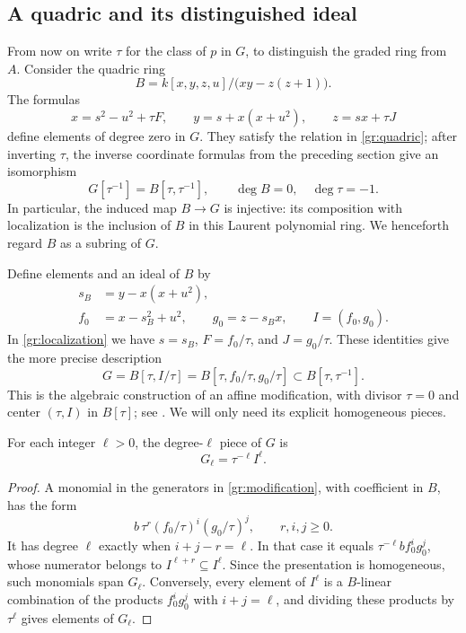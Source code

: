 \subsection{A quadric and its distinguished ideal}

From now on write $\tau$ for the class of $p$ in $G$, to distinguish
the graded ring from $A$.  Consider the quadric ring
\begin{equation}
\label{gr:quadric}
 B=k[x,y,z,u]/\bigl(xy-z(z+1)\bigr).
\end{equation}
The formulas
\[
 x=s^2-u^2+\tau F,\qquad
 y=s+x(x+u^2),\qquad z=sx+\tau J
\]
define elements of degree zero in $G$.  They satisfy the relation in
\eqref{gr:quadric}; after inverting $\tau$, the inverse coordinate
formulas from the preceding section give an isomorphism
\begin{equation}
\label{gr:localization}
 G[\tau^{-1}]=B[\tau,\tau^{-1}],
 \qquad \deg B=0,\quad \deg\tau=-1.
\end{equation}
In particular, the induced map $B\to G$ is injective: its composition
with localization is the inclusion of $B$ in this Laurent polynomial
ring.  We henceforth regard $B$ as a subring of $G$.

Define elements and an ideal of $B$ by
\begin{equation}
\label{gr:ideal}
 \begin{aligned}
 s_B&=y-x(x+u^2),\\
 f_0&=x-s_B^2+u^2,\qquad
 g_0=z-s_Bx,\qquad I=(f_0,g_0).
 \end{aligned}
\end{equation}
In \eqref{gr:localization} we have $s=s_B$, $F=f_0/\tau$, and
$J=g_0/\tau$.  These identities give the more precise description
\begin{equation}
\label{gr:modification}
 G=B[\tau,I/\tau]
   =B[\tau,f_0/\tau,g_0/\tau]
   \subset B[\tau,\tau^{-1}].
\end{equation}
This is the algebraic construction of an affine modification, with
divisor $\tau=0$ and center $(\tau,I)$ in $B[\tau]$; see
\cite[Definition~1.1 and Proposition~1.1(b)]{KalimanZaidenberg1999}.
We will only need its explicit
homogeneous pieces.

\begin{lemma}
\label{gr:positive-piece}
For each integer $\ell>0$, the degree-$\ell$ piece of $G$ is
\[
 G_\ell=\tau^{-\ell}I^\ell.
\]
\end{lemma}

\begin{proof}
A monomial in the generators in \eqref{gr:modification}, with
coefficient in $B$, has the form
\[
 b\,\tau^r(f_0/\tau)^i(g_0/\tau)^j,
 \qquad r,i,j\ge0.
\]
It has degree $\ell$ exactly when $i+j-r=\ell$.
In that case it equals $\tau^{-\ell}b f_0^i g_0^j$, whose numerator
belongs to $I^{\ell+r}\subseteq I^\ell$.
Since the presentation is homogeneous, such monomials span $G_\ell$.
Conversely, every element of $I^\ell$ is a $B$-linear combination of
the products $f_0^i g_0^j$ with $i+j=\ell$, and dividing these
products by $\tau^\ell$ gives elements of $G_\ell$.
\end{proof}

